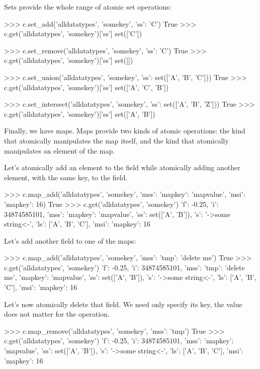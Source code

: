 Sets provide the whole range of atomic set operations:

\begin{pythoncode}
>>> c.set_add('alldatatypes', 'somekey', {'ss': 'C'})
True
>>> c.get('alldatatypes', 'somekey')['ss']
set(['C'])

>>> c.set_remove('alldatatypes', 'somekey', {'ss': 'C'})
True
>>> c.get('alldatatypes', 'somekey')['ss']
set([])

>>> c.set_union('alldatatypes', 'somekey', {'ss': set(['A', 'B', 'C'])})
True
>>> c.get('alldatatypes', 'somekey')['ss']
set(['A', 'C', 'B'])

>>> c.set_intersect('alldatatypes', 'somekey', {'ss': set(['A', 'B', 'Z'])})
True
>>> c.get('alldatatypes', 'somekey')['ss']
set(['A', 'B'])
\end{pythoncode}

Finally, we have maps. Maps provide two kinds of atomic operations: the kind
that atomically manipulates the map itself, and the kind that atomically
manipulates an element of the map.

Let's atomically add an element to the  field while atomically adding
another element, with the same key, to the  field.

\begin{pythoncode}
>>> c.map_add('alldatatypes', 'somekey', {'mss': {'mapkey': 'mapvalue'}, 'msi': {'mapkey': 16}})
True
>>> c.get('alldatatypes', 'somekey')
{'f': -0.25, 'i': 34874585101, 'mss': {'mapkey': 'mapvalue'}, 'ss': set(['A', 'B']), 's': '->some string<-', 'ls': ['A', 'B', 'C'], 'msi': {'mapkey': 16}}
\end{pythoncode}

Let's add another field to one of the maps:

\begin{pythoncode}
>>> c.map_add('alldatatypes', 'somekey', {'mss': {'tmp': 'delete me'}})
True
>>> c.get('alldatatypes', 'somekey')
{'f': -0.25, 'i': 34874585101, 'mss': {'tmp': 'delete me', 'mapkey': 'mapvalue'}, 'ss': set(['A', 'B']), 's': '->some string<-', 'ls': ['A', 'B', 'C'], 'msi': {'mapkey': 16}}
\end{pythoncode}

Let's now atomically delete that field. We need only specify its key, the value
does not matter for the  operation.

\begin{pythoncode}
>>> c.map_remove('alldatatypes', 'somekey', {'mss': 'tmp'})
True
>>> c.get('alldatatypes', 'somekey')
{'f': -0.25, 'i': 34874585101, 'mss': {'mapkey': 'mapvalue'}, 'ss': set(['A', 'B']), 's': '->some string<-', 'ls': ['A', 'B', 'C'], 'msi': {'mapkey': 16}}
\end{pythoncode}

